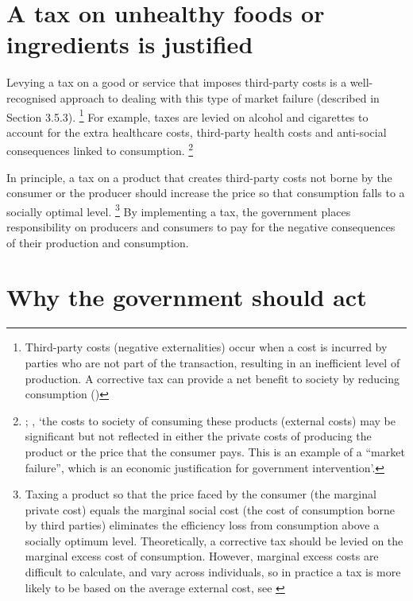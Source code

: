 \documentclass[embargoed]{grattan}
\begin{document}
\section{A tax on unhealthy foods or ingredients is justified}\label{a-tax-on-unhealthy-foods-or-ingredients-is-justified}

Levying a tax on a good or service that imposes third-party costs is a well-recognised approach to dealing with this type of market failure (described in Section 3.5.3).%
\footnote{Third-party costs (negative externalities) occur when a cost is incurred by parties who are not part of the transaction, resulting in an inefficient level of production.
A corrective tax can provide a net benefit to society by reducing consumption (\textcites{Freebairn2010Taxationobesity}{Greenwald1986Externalitieseconomiesimperfect})} For example, taxes are levied on alcohol and cigarettes to account for the extra healthcare costs, third-party health costs and anti-social consequences linked to consumption.%
\footnote{\textcite{Bahl2003uneasycasediscriminatory}; \textcite{Organisation2015Usingpricepolicies}, `the costs to society of consuming these products (external costs) may be significant but not reflected in either the private costs of producing the product or the price that the consumer pays.
This is an example of a ``market failure'', which is an economic justification for government intervention'.}

In principle, a tax on a product that creates third-party costs not borne by the consumer or the producer should increase the price so that consumption falls to a socially optimal level.%
\footnote{Taxing a product so that the price faced by the consumer (the marginal private cost) equals the marginal social cost (the cost of consumption borne by third parties) eliminates the efficiency loss from consumption above a socially optimum level.
Theoretically, a corrective tax should be levied on the marginal excess cost of consumption.
However, marginal excess costs are difficult to calculate, and vary across individuals, so in practice a tax is more likely to be based on the average external cost, see \textcite{CnossenExcisetaxationAustralia}} By implementing a tax, the government places responsibility on producers and consumers to pay for the negative consequences of their production and consumption.

\section{Why the government should act}\label{why-the-government-should-act}
\end{document}
